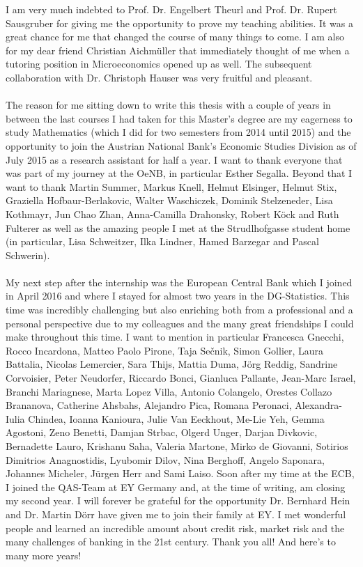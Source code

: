 \newpage
\thispagestyle{empty} %
I am very much indebted to Prof. Dr. Engelbert Theurl and Prof. Dr. Rupert Sausgruber for giving me the opportunity to prove my teaching abilities. It was a great chance for me that changed the course of many things to come. I am also for  my dear friend Christian Aichmüller that immediately thought of me when a tutoring position in Microeconomics opened up as well. The subsequent collaboration with Dr. Christoph Hauser was very fruitful and pleasant.\\
\\
The reason for me sitting down to write this thesis with a couple of years in between the last courses I had taken for this Master's degree are my eagerness to study Mathematics (which I did for two semesters from 2014 until 2015) and the opportunity to join the Austrian National Bank's Economic Studies Division as of July 2015 as a research assistant for half a year. I want to thank everyone that was part of my journey at the OeNB, in particular Esther Segalla. Beyond that I want to thank Martin Summer, Markus Knell, Helmut Elsinger, Helmut Stix, Graziella Hofbaur-Berlakovic, Walter Waschiczek, Dominik Stelzeneder, Lisa Kothmayr, Jun Chao Zhan, Anna-Camilla Drahonsky, Robert Köck and Ruth Fulterer as well as the amazing people I met at the Strudlhofgasse student home (in particular, Lisa Schweitzer, Ilka Lindner, Hamed Barzegar and Pascal Schwerin).  \\
\\
My next step after the internship was the European Central Bank which I joined in April 2016 and where I stayed for almost two years in the DG-Statistics. This time was incredibly challenging but also enriching both from a professional and a personal perspective due to my colleagues and the many great friendships I could make throughout this time. I want to mention in particular Francesca Gnecchi, Rocco Incardona, Matteo Paolo Pirone, Taja Sečnik, Simon Gollier, Laura Battalia, Nicolas Lemercier, Sara Thijs, Mattia Duma, Jörg Reddig, Sandrine Corvoisier, Peter Neudorfer, Riccardo Bonci, Gianluca Pallante, Jean-Marc Israel, Branchi Mariagnese, Marta Lopez Villa, Antonio Colangelo, Orestes Collazo Brananova, Catherine Ahsbahs, Alejandro Pica, Romana Peronaci, Alexandra-Iulia Chindea, Ioanna Kanioura, Julie Van Eeckhout, Me-Lie Yeh, Gemma Agostoni, Zeno Benetti, Damjan Strbac, Olgerd Unger, Darjan Divkovic, Bernadette Lauro, Krishanu Saha, Valeria Martone, Mirko de Giovanni, Sotirios Dimitrios Anagnostidis, Lyubomir Dilov, Nina Berghoff, Angelo Saponara, Johannes Micheler, Jürgen Herr and Sami Laiso.
\newpage
\thispagestyle{empty} %
Soon after my time at the ECB, I joined the QAS-Team at EY Germany and, at the time of writing, am closing my second year. I will forever be grateful for the opportunity Dr. Bernhard Hein and Dr. Martin Dörr have given me to join their family at EY. I met wonderful people and learned an incredible amount about credit risk, market risk and the many challenges of banking in the 21st century. Thank you all! And here's to many more years!
